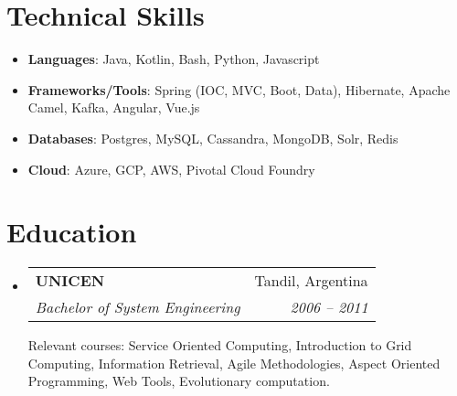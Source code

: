 \documentclass[letterpaper,11pt]{article}
\makeatletter
\newcommand{\resumeSubheadingDescription}[5]{
  \vspace{-1pt}\item
    \begin{tabular*}{0.97\textwidth}[t]{l@{\extracolsep{\fill}}r}
      \textbf{#1} & #2 \\
      \textit{\small#3} & \textit{\small #4} \\
    \end{tabular*}\vspace{1pt}
	\small#5\vspace{-4pt}
}
\newcommand{\resumeSubHeadingListStart}{\begin{itemize}[leftmargin=*]}
\newcommand{\resumeSubHeadingListEnd}{\end{itemize}}
\makeatother
\begin{document}
\section{Technical Skills}
  \resumeSubHeadingListStart
    \item{
      \textbf{Languages}{: Java, Kotlin, Bash, Python, Javascript}
    }   
    \item{
       \textbf{Frameworks/Tools}{: Spring (IOC, MVC, Boot, Data), Hibernate, Apache Camel, Kafka, Angular, Vue.js}
    }       
    \item{
       \textbf{Databases}{: Postgres, MySQL, Cassandra, MongoDB, Solr, Redis}
    }
    \item{
       \textbf{Cloud}{: Azure, GCP, AWS, Pivotal Cloud Foundry}
    }
  \resumeSubHeadingListEnd

\section{Education}
  \resumeSubHeadingListStart
    \resumeSubheadingDescription
      {UNICEN}{Tandil, Argentina}
      {Bachelor of System Engineering}{2006 -- 2011}
      {Relevant courses: Service Oriented Computing, Introduction to Grid Computing, Information Retrieval, Agile Methodologies, Aspect Oriented Programming, Web Tools, Evolutionary computation.}
  \resumeSubHeadingListEnd
\end{document}
